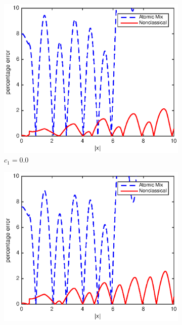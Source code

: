 \documentclass[12pt]{article}
\begin{document}
{\begin{figure}[p]
    \centering
    \begin{subfigure}{0.495\textwidth}
        \centering
        \includegraphics[width=\textwidth]{NSE_err_B00.eps}
        \caption{$c_1 = 0.0$}
        \label{figerrB00}
    \end{subfigure}
    \hfill
    \begin{subfigure}{0.495\textwidth}
        \centering
        \includegraphics[width=\textwidth]{NSE_err_B10.eps}

\end{subfigure}
\end{figure}}
\end{document}
